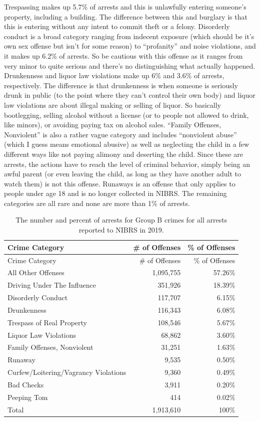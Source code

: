 \documentclass[
  12pt,
  openany]{book}
\begin{document}
Trespassing makes up 5.7\% of arrests and this is unlawfully entering someone's property, including a building. The difference between this and burglary is that this is entering without any intent to commit theft or a felony. Disorderly conduct is a broad category ranging from indecent exposure (which should be it's own sex offense but isn't for some reason) to ``profanity'' and noise violations, and it makes up 6.2\% of arrests. So be cautious with this offense as it ranges from very minor to quite serious and there's no distinguishing what actually happened. Drunkenness and liquor law violations make up 6\% and 3.6\% of arrests, respectively. The difference is that drunkenness is when someone is seriously drunk in public (to the point where they can't control their own body) and liquor law violations are about illegal making or selling of liquor. So basically bootlegging, selling alcohol without a license (or to people not allowed to drink, like minors), or avoiding paying tax on alcohol sales. ``Family Offenses, Nonviolent'' is also a rather vague category and includes ``nonviolent abuse'' (which I guess means emotional abusive) as well as neglecting the child in a few different ways like not paying alimony and deserting the child. Since these are arrests, the actions have to reach the level of criminal behavior, simply being an awful parent (or even leaving the child, as long as they have another adult to watch them) is not this offense. Runaways is an offense that only applies to people under age 18 and is no longer collected in NIBRS. The remaining categories are all rare and none are more than 1\% of arrests.

\begin{longtable}[]{@{}lrr@{}}
\caption{\label{tab:GroupBarresteeCrime}The number and percent of arrests for Group B crimes for all arrests reported to NIBRS in 2019.}\tabularnewline
\toprule
Crime Category & \# of Offenses & \% of Offenses\tabularnewline
\midrule
\endfirsthead
\toprule
Crime Category & \# of Offenses & \% of Offenses\tabularnewline
\midrule
\endhead
All Other Offenses & 1,095,755 & 57.26\%\tabularnewline
Driving Under The Influence & 351,926 & 18.39\%\tabularnewline
Disorderly Conduct & 117,707 & 6.15\%\tabularnewline
Drunkenness & 116,343 & 6.08\%\tabularnewline
Trespass of Real Property & 108,546 & 5.67\%\tabularnewline
Liquor Law Violations & 68,862 & 3.60\%\tabularnewline
Family Offenses, Nonviolent & 31,251 & 1.63\%\tabularnewline
Runaway & 9,535 & 0.50\%\tabularnewline
Curfew/Loitering/Vagrancy Violations & 9,360 & 0.49\%\tabularnewline
Bad Checks & 3,911 & 0.20\%\tabularnewline
Peeping Tom & 414 & 0.02\%\tabularnewline
Total & 1,913,610 & 100\%\tabularnewline
\bottomrule
\end{longtable}
\end{document}
